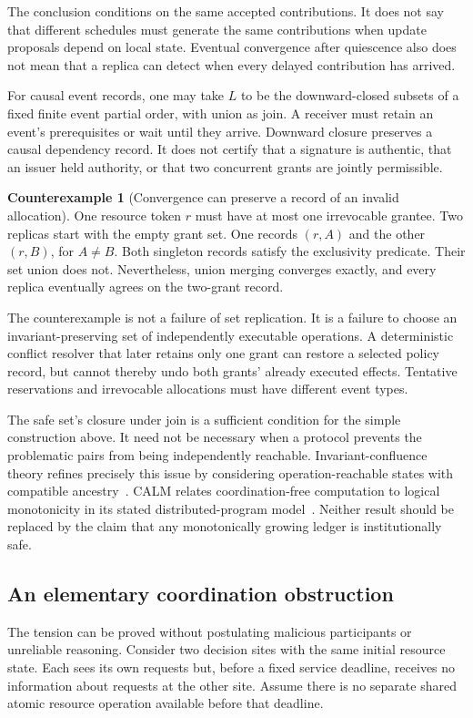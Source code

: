 \documentclass[11pt,letterpaper]{article}
\theoremstyle{plain}
\theoremstyle{definition}
\newtheorem{counterexample}[proposition]{Counterexample}
\theoremstyle{remark}
\begin{document}
The conclusion conditions on the same accepted contributions. It does not say that different schedules must generate the same contributions when update proposals depend on local state. Eventual convergence after quiescence also does not mean that a replica can detect when every delayed contribution has arrived.

For causal event records, one may take $L$ to be the downward-closed subsets of a fixed finite event partial order, with union as join. A receiver must retain an event's prerequisites or wait until they arrive. Downward closure preserves a causal dependency record. It does not certify that a signature is authentic, that an issuer held authority, or that two concurrent grants are jointly permissible.

\begin{counterexample}[Convergence can preserve a record of an invalid allocation]\label{ex:convergent-double-grant}
One resource token $r$ must have at most one irrevocable grantee. Two replicas start with the empty grant set. One records $(r,A)$ and the other $(r,B)$, for $A\ne B$. Both singleton records satisfy the exclusivity predicate. Their set union does not. Nevertheless, union merging converges exactly, and every replica eventually agrees on the two-grant record.
\end{counterexample}

The counterexample is not a failure of set replication. It is a failure to choose an invariant-preserving set of independently executable operations. A deterministic conflict resolver that later retains only one grant can restore a selected policy record, but cannot thereby undo both grants' already executed effects. Tentative reservations and irrevocable allocations must have different event types.

The safe set's closure under join is a sufficient condition for the simple construction above. It need not be necessary when a protocol prevents the problematic pairs from being independently reachable. Invariant-confluence theory refines precisely this issue by considering operation-reachable states with compatible ancestry~\cite{bailisinvariant}. CALM relates coordination-free computation to logical monotonicity in its stated distributed-program model~\cite{hellerstein-calm}. Neither result should be replaced by the claim that any monotonically growing ledger is institutionally safe.

\subsection{An elementary coordination obstruction}
The tension can be proved without postulating malicious participants or unreliable reasoning. Consider two decision sites with the same initial resource state. Each sees its own requests but, before a fixed service deadline, receives no information about requests at the other site. Assume there is no separate shared atomic resource operation available before that deadline.
\end{document}
